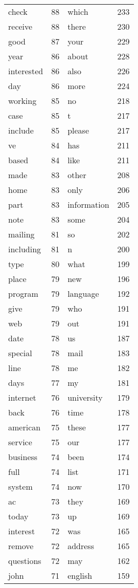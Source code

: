 \documentclass[10pt, a4paper]{article}
\begin{document}
\begin{tabular}{l c l c}
check & 88 & which & 233 \\
receive & 88 & there & 230 \\
good & 87 & your & 229 \\
year & 86 & about & 228 \\
interested & 86 & also & 226 \\
day & 86 & more & 224 \\
working & 85 & no & 218 \\
case & 85 & t & 217 \\
include & 85 & please & 217 \\
ve & 84 & has & 211 \\
based & 84 & like & 211 \\
made & 83 & other & 208 \\
home & 83 & only & 206 \\
part & 83 & information & 205 \\
note & 83 & some & 204 \\
mailing & 81 & so & 202 \\
including & 81 & n & 200 \\
type & 80 & what & 199 \\
place & 79 & new & 196 \\
program & 79 & language & 192 \\
give & 79 & who & 191 \\
web & 79 & out & 191 \\
date & 78 & us & 187 \\
special & 78 & mail & 183 \\
line & 78 & me & 182 \\
days & 77 & my & 181 \\
internet & 76 & university & 179 \\
back & 76 & time & 178 \\
american & 75 & these & 177 \\
service & 75 & our & 177 \\
business & 74 & been & 174 \\
full & 74 & list & 171 \\
system & 74 & now & 170 \\
ac & 73 & they & 169 \\
today & 73 & up & 169 \\
interest & 72 & was & 165 \\
remove & 72 & address & 165 \\
questions & 72 & may & 162 \\
john & 71 & english & 159 \\

\end{tabular}
\end{document}
